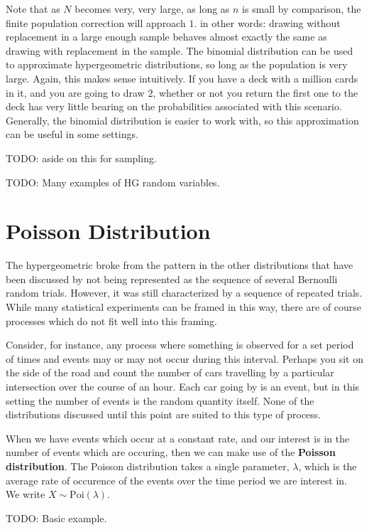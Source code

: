 \documentclass[
  letterpaper,
  DIV=11,
  numbers=noendperiod]{scrreprt}
\begin{document}
Note that as \(N\) becomes very, very large, as long as \(n\) is small
by comparison, the finite population correction will approach \(1\). in
other words: drawing without replacement in a large enough sample
behaves almost exactly the same as drawing with replacement in the
sample. The binomial distribution can be used to approximate
hypergeometric distributions, so long as the population is very large.
Again, this makes sense intuitively. If you have a deck with a million
cards in it, and you are going to draw \(2\), whether or not you return
the first one to the deck has very little bearing on the probabilities
associated with this scenario. Generally, the binomial distribution is
easier to work with, so this approximation can be useful in some
settings.

TODO: aside on this for sampling.

TODO: Many examples of HG random variables.

\section{Poisson Distribution}\label{poisson-distribution}

The hypergeometric broke from the pattern in the other distributions
that have been discussed by not being represented as the sequence of
several Bernoulli random trials. However, it was still characterized by
a sequence of repeated trials. While many statistical experiments can be
framed in this way, there are of course processes which do not fit well
into this framing.

Consider, for instance, any process where something is observed for a
set period of times and events may or may not occur during this
interval. Perhaps you sit on the side of the road and count the number
of cars travelling by a particular intersection over the course of an
hour. Each car going by is an event, but in this setting the number of
events is the random quantity itself. None of the distributions
discussed until this point are suited to this type of process.

When we have events which occur at a constant rate, and our interest is
in the number of events which are occuring, then we can make use of the
\textbf{Poisson distribution}. The Poisson distribution takes a single
parameter, \(\lambda\), which is the average rate of occurence of the
events over the time period we are interest in. We write
\(X\sim\text{Poi}(\lambda)\).

TODO: Basic example.
\end{document}
